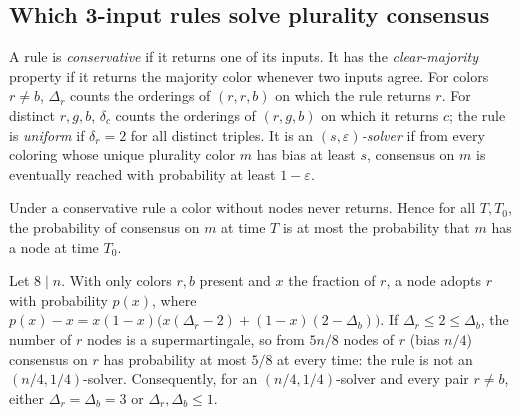 \subsection{Which 3-input rules solve plurality consensus}

\begin{definition}\label{def:good_rules}
  \leanok
  A rule is \emph{conservative} if it returns one of its inputs. It has the
  \emph{clear-majority} property if it returns the majority color whenever two
  inputs agree. For colors $r \ne b$, $\Delta_r$ counts the orderings of
  $(r,r,b)$ on which the rule returns $r$. For distinct $r,g,b$, $\delta_c$
  counts the orderings of $(r,g,b)$ on which it returns $c$; the rule is
  \emph{uniform} if $\delta_r = 2$ for all distinct triples. It is an
  \emph{$(s,\varepsilon)$-solver} if from every coloring whose unique plurality
  color $m$ has bias at least $s$, consensus on $m$ is eventually reached with
  probability at least $1-\varepsilon$.
\end{definition}

\begin{lemma}\label{lem:alive}
  \leanok
  Under a conservative rule a color without nodes never returns. Hence for all
  $T, T_0$, the probability of consensus on $m$ at time $T$ is at most the
  probability that $m$ has a node at time $T_0$.
\end{lemma}

\begin{theorem}\label{thm:4_8_a}
  \leanok
  Let $8 \mid n$. With only colors $r, b$ present and $x$ the fraction of $r$,
  a node adopts $r$ with probability $p(x)$, where
  $p(x) - x = x(1-x)\bigl(x(\Delta_r - 2) + (1-x)(2 - \Delta_b)\bigr)$. If
  $\Delta_r \le 2 \le \Delta_b$, the number of $r$ nodes is a supermartingale,
  so from $5n/8$ nodes of $r$ (bias $n/4$) consensus on $r$ has probability at
  most $5/8$ at every time: the rule is not an $(n/4, 1/4)$-solver.
  Consequently, for an $(n/4, 1/4)$-solver and every pair $r \ne b$, either
  $\Delta_r = \Delta_b = 3$ or $\Delta_r, \Delta_b \le 1$.
\end{theorem}

